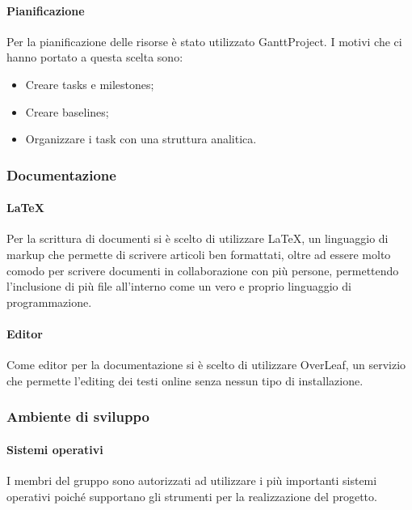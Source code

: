                         \paragraph{Pianificazione}
                            Per la pianificazione delle risorse è stato utilizzato GanttProject. I motivi che ci hanno portato a questa scelta sono:
                            \begin{itemize}
                                \item Creare tasks e milestones;
                                \item Creare baselines;
                                \item Organizzare i task con una struttura analitica.
                            \end{itemize}
                        \subsubsection{Documentazione}
                        \paragraph{\LaTeX} 
                            Per la scrittura di documenti si è scelto di utilizzare \LaTeX, un linguaggio di markup che permette di scrivere articoli ben formattati, oltre ad essere molto comodo per scrivere documenti in collaborazione con più persone, permettendo l'inclusione di più file all'interno come un vero e proprio linguaggio di programmazione.
                        \newline
                        \paragraph{Editor}
                            Come editor per la documentazione si è scelto di utilizzare OverLeaf, un servizio che permette l'editing dei testi online senza nessun tipo di installazione.
                        \subsubsection{Ambiente di sviluppo}
                            \paragraph{Sistemi operativi}
                                I membri del gruppo sono autorizzati ad utilizzare i più importanti sistemi operativi poiché supportano gli strumenti per la realizzazione del progetto.
